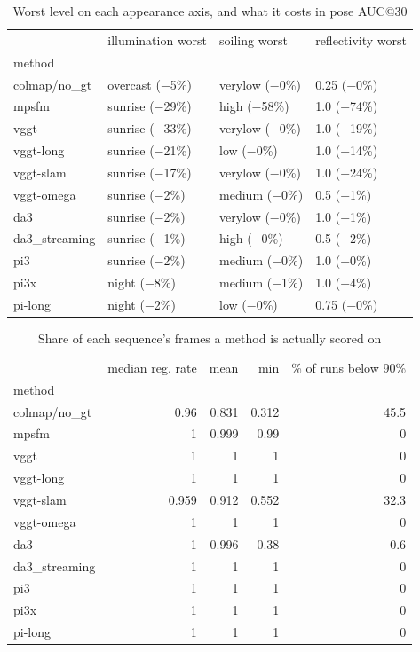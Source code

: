 \begin{table}
\caption{Worst level on each appearance axis, and what it costs in pose AUC@30}
\label{tab:t5_robustness}
\begin{tabular}{llll}
\toprule
 & illumination worst & soiling worst & reflectivity worst \\
method &  &  &  \\
\midrule
colmap/no\_gt & overcast (−5\%) & verylow (−0\%) & 0.25 (−0\%) \\
mpsfm & sunrise (−29\%) & high (−58\%) & 1.0 (−74\%) \\
vggt & sunrise (−33\%) & verylow (−0\%) & 1.0 (−19\%) \\
vggt-long & sunrise (−21\%) & low (−0\%) & 1.0 (−14\%) \\
vggt-slam & sunrise (−17\%) & verylow (−0\%) & 1.0 (−24\%) \\
vggt-omega & sunrise (−2\%) & medium (−0\%) & 0.5 (−1\%) \\
da3 & sunrise (−2\%) & verylow (−0\%) & 1.0 (−1\%) \\
da3\_streaming & sunrise (−1\%) & high (−0\%) & 0.5 (−2\%) \\
pi3 & sunrise (−2\%) & medium (−0\%) & 1.0 (−0\%) \\
pi3x & night (−8\%) & medium (−1\%) & 1.0 (−4\%) \\
pi-long & night (−2\%) & low (−0\%) & 0.75 (−0\%) \\
\bottomrule
\end{tabular}
\end{table}


\begin{table}
\caption{Share of each sequence's frames a method is actually scored on}
\label{tab:t6_frame_registration}
\begin{tabular}{lrrrr}
\toprule
 & median reg. rate & mean & min & \% of runs below 90\% \\
method &  &  &  &  \\
\midrule
colmap/no\_gt & 0.96 & 0.831 & 0.312 & 45.5 \\
mpsfm & 1 & 0.999 & 0.99 & 0 \\
vggt & 1 & 1 & 1 & 0 \\
vggt-long & 1 & 1 & 1 & 0 \\
vggt-slam & 0.959 & 0.912 & 0.552 & 32.3 \\
vggt-omega & 1 & 1 & 1 & 0 \\
da3 & 1 & 0.996 & 0.38 & 0.6 \\
da3\_streaming & 1 & 1 & 1 & 0 \\
pi3 & 1 & 1 & 1 & 0 \\
pi3x & 1 & 1 & 1 & 0 \\
pi-long & 1 & 1 & 1 & 0 \\
\bottomrule
\end{tabular}
\end{table}


